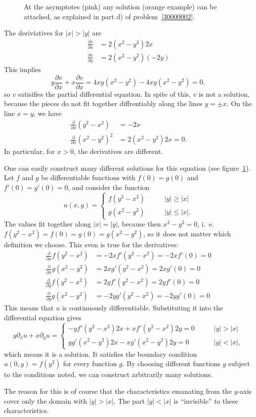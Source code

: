 \begin{loesung}
\begin{teilaufgaben}
\begin{figure}
{At the asymptotes (pink) any solution (orange example) can be attached,
as explained in
part d) of problem~\ref{30000002}.
\label{30000002:solutionfigure}}
\end{figure}
\item
The deriviatives for $|x|>|y|$ are
\begin{align*}
\frac{\partial v}{\partial x}
&=2(x^2-y^2)2x\\
\frac{\partial v}{\partial y}
&=2(x^2-y^2)(-2y)
\end{align*}
This implies
\[
y\frac{\partial v}{\partial x}
+
x \frac{\partial v}{\partial x}
=
4xy(x^2-y^2)
-4xy(x^2-y^2)=0,
\]
so $v$ satisifies the partial differential equation.
In spite of this, $v$ is not a solution, because the pieces do not
fit together diffrentiably along the  lines $y=\pm x$.
On the line $x=y$, we have
\begin{align*}
\frac{\partial}{\partial x}(y^2-x^2)&=-2x\\
\frac{\partial}{\partial x}(x^2-y^2)^2&=2(x^2-y^2)2x=0.
\end{align*}
In particular, for $x>0$, the derivatives are different.
\end{teilaufgaben}

One can easily construct many different solutions for this equation
(see figure~\ref{30000002:solutionfigure}).
Let $f$ and $g$ be differentiable functions with $f(0)=g(0)$
and $f'(0)=g'(0)=0$, and consider the function
\[
u(x,y)=\begin{cases}
f(y^2-x^2)&\qquad |y|\ge|x|\\
g(x^2-y^2)&\qquad |y|\le|x|.
\end{cases}
\]
The values fit together along $|x|=|y|$, because then $x^2-y^2=0$,
i.~e.~$f(y^2-x^2)=f(0)=g(0)=g(x^2-y^2)$, so it does not matter which
definition we choose.
This even is true for the derivatives:
\begin{align*}
\frac{\partial}{\partial x}f(y^2-x^2)&=-2xf'(y^2-x^2)=-2xf'(0)=0
\\
\frac{\partial}{\partial x}g(x^2-y^2)&=2xg'(y^2-x^2)=2xg'(0)=0
\\
\frac{\partial}{\partial y}f(y^2-x^2)&=2yf'(y^2-x^2)=2yf'(0)=0
\\
\frac{\partial}{\partial y}g(x^2-y^2)&=-2yg'(y^2-x^2)=-2yg'(0)=0
\end{align*}
This means that $u$ is continuously differentiable.
Substituting it into the differential equation gives
\[
y\partial_xu+x\partial_yu
=
\begin{cases}
-yf'(y^2-x^2)2x+xf'(y^2-x^2)2y=0&\qquad |y|>|x|\\
yg'(x^2-y^2)2x-xg'(x^2-y^2)2y=0&\qquad |y|<|x|,
\end{cases}
\]
which means it is a solution.
It satisfies the boundary condition $u(0,y)=f(y^2)$ for every function $g$.
By choosing different functions $g$ subject to the conditions noted,
we can construct arbitrarily many solutions.

The reason for this is of course that the characteristics emanating from
the $y$-axis cover only the domain with $|y|> |x|$.
The part $|y|<|x|$ is ``invisible'' to these characteristics.
\end{loesung}

